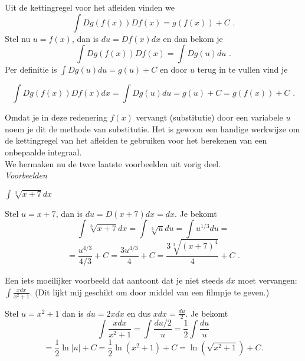Uit de kettingregel voor het afleiden vinden we
\[
\int Dg(f(x))Df(x)=g(f(x))+C \text { .}
\]
Stel nu $u=f(x)$, dan is $du=Df(x)dx$ en dan bekom je
\[
\int Dg(f(x))Df(x)=\int Dg(u)du \text { .}
\]
Per definitie is $\int Dg(u)du=g(u)+C$ en door $u$ terug in te vullen vind je
\begin{definitie}
	\[
\int Dg(f(x))Df(x)dx=\int Dg(u)du=g(u)+C=g(f(x))+C \text { .}
\]
\end{definitie}

Omdat je in deze redenering $f(x)$ vervangt (substitutie) door een variabele $u$ noem je dit de methode van substitutie.
Het is gewoon een handige werkwijze om de kettingregel van het afleiden te gebruiken voor het berekenen van een onbepaalde integraal.\\

We hermaken nu de twee laatste voorbeelden uit vorig deel.\\

\emph{Voorbeelden}

\begin{voorbeeld}
	$\int \sqrt[3]{x+7} dx$

Stel $u=x+7$, dan is $du=D(x+7)dx=dx$.
Je bekomt
\[
\int \sqrt[3]{x+7}dx=\int \sqrt[3]{u}du=\int u^{1/3} du=
\]
\[
=\frac{u^{4/3}}{4/3}+C=\frac{3u^{4/3}}{4}+C=\frac {3\sqrt[3]{(x+7)^4}}{4}+C \text { .}
\]

\end{voorbeeld}

%
%
\vspace{2mm}

\begin{voorbeeld}
	Een iets moeilijker voorbeeld dat aantoont dat je niet steeds $dx$ moet vervangen: $\int \frac{xdx}{x^2+1}$.
\noindent (Dit lijkt mij geschikt om door middel van een filmpje te geven.)

Stel $u=x^2+1$ dan is $du=2xdx$ en dus $xdx=\frac{du}{2}$.
Je bekomt
\[
\int \frac{xdx}{x^2+1}=\int \frac{du/2}{u}=\frac{1}{2} \int \frac{du}{u}
\]
\[
=\frac{1}{2} \ln \vert u \vert +C=\frac{1}{2} \ln \left( x^2+1 \right)+C=\ln \left( \sqrt{x^2+1} \right)+C \text {.}
\]


\end{voorbeeld}

